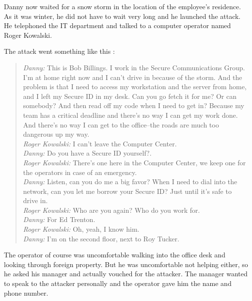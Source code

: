 Danny now waited for a snow storm in the location of the employee's residence.
As it was winter, he did not have to wait very long and he launched the attack.
He telephoned the IT department and talked to a computer operator named Roger
Kowalski.

The attack went something like this \cite[p. 86]{mitnick2003}:

\begin{quote}
\textit{Danny:} \glqq{}This is Bob Billings. I work in the Secure Communications Group. I'm at
home right now and I can't drive in because of the storm. And the problem is
that I need to access my workstation and the server from home, and I left my
Secure ID in my desk. Can you go fetch it for me? Or can somebody? And then
read off my code when I need to get in? Because my team has a critical deadline
and there's no way I can get my work done. And there's no way I can get to the
office--the roads are much too dangerous up my way.\grqq{}\\
\textit{Roger Kowalski:} \glqq{}I can't leave the Computer Center.\grqq{}\\
\textit{Danny:} \glqq{}Do you have a Secure ID yourself?.\grqq{}\\
\textit{Roger Kowalski:} \glqq{}There's one here in the Computer Center, we keep one
for the operators in case of an emergency.\grqq{}\\
\textit{Danny:} \glqq{}Listen, can you do me a big favor? When I need to dial into
the network, can you let me borrow your Secure ID? Just until it's safe to
drive in.\grqq{}\\
\textit{Roger Kowalski:} \glqq{}Who are you again? Who do you work for.\grqq{}\\
\textit{Danny:} \glqq{}For Ed Trenton.\grqq{}\\
\textit{Roger Kowalski:} \glqq{}Oh, yeah, I know him.\grqq{}\\
\textit{Danny:} \glqq{}I'm on the second floor, next to Roy Tucker.\grqq{}\\

\end{quote}

The operator of course was uncomfortable walking into the office desk and
looking through foreign property. But he was uncomfortable not helping either,
so he asked his manager and actually vouched for the attacker. The manager
wanted to speak to the attacker personally and the operator gave him the name
and phone number.

